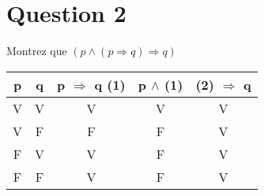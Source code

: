 \section*{Question 2}
Montrez que \((p \wedge (p \Rightarrow q) \Rightarrow q)\)
\bigskip

\begin{tabular}{|cc|c|c|c|}
	\hline
	p & q & p $\Rightarrow$ q (1) & p $\wedge$ (1) & (2) $\Rightarrow$ q \\ \hline
	V & V &           V           &       V        &          V          \\ \hline
	V & F &           F           &       F        &          V          \\ \hline
	F & V &           V           &       F        &          V          \\ \hline
	F & F &           V           &       F        &          V          \\ \hline
\end{tabular}
